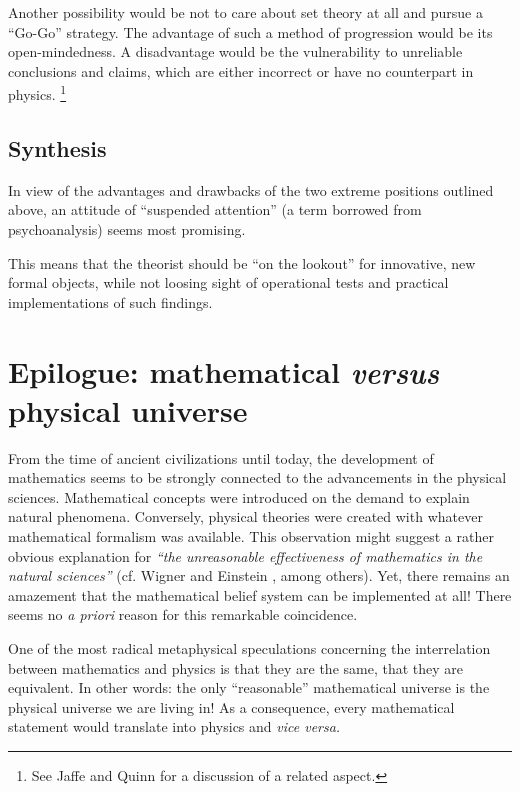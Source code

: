 Another possibility would be not to care about set theory at all and
pursue a ``Go-Go'' strategy. The advantage of such a method of
progression
would be its open-mindedness. A disadvantage would be the vulnerability
to unreliable conclusions and claims, which are either incorrect or
have no counterpart in physics. \footnote{
See Jaffe and Quinn \cite{jaffe-quinn} for a discussion of a related
aspect.}

\subsection{Synthesis}

In view of the advantages and drawbacks of the two extreme positions
outlined above, an attitude of
``suspended attention''
(a term borrowed from psychoanalysis) seems most promising.

This means that the theorist should be ``on the lookout'' for
innovative, new formal objects, while
not loosing sight of operational tests and
practical implementations of such findings.

\section{Epilogue: mathematical {\it versus} physical universe}

From the time of ancient
civilizations until today,
the development of mathematics seems to be strongly
connected to the advancements in the physical sciences.
Mathematical concepts were introduced
on the demand to explain natural phenomena. Conversely, physical
theories were created with whatever mathematical formalism was
available.
This observation might suggest a rather obvious explanation for
 {\em ``the unreasonable effectiveness of mathematics in the natural
 sciences''} (cf. Wigner \cite{wigner} and Einstein
\cite{einstein-math}, among others). Yet, there remains
an amazement that the
 mathematical belief system can be implemented at all! There
seems no {\it a priori} reason for this remarkable coincidence.

One of the most radical metaphysical speculations concerning the
interrelation between mathematics and physics is that they are the same,
that they are equivalent. In other words: the only
``reasonable'' mathematical universe is the physical universe we are
living in!
As a consequence, every mathematical statement would translate into
physics and
{\em vice versa.}

